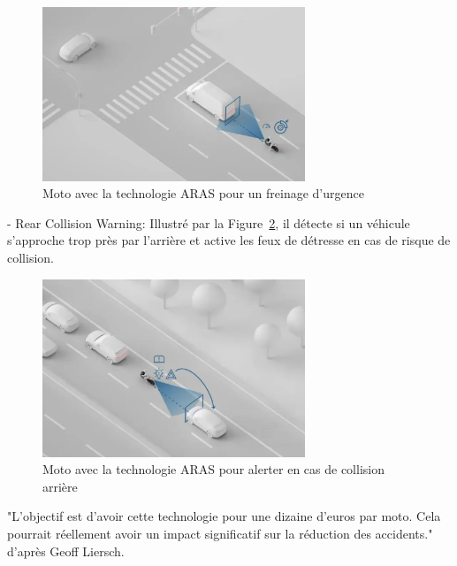 \begin{figure}[H]
    \centering
    \includegraphics[width=0.7\textwidth]{images/ktm_detecteur_dev.png} 
    \caption{Moto avec la technologie ARAS pour un freinage d'urgence}
    \label{detecteuravant}
\end{figure}
- Rear Collision Warning: Illustré par la Figure~\ref{detecteurarriere}, il détecte si un véhicule s'approche trop près par l'arrière et active les feux de détresse en cas de risque de collision. 
\begin{figure}[H]
    \centering
    \includegraphics[width=0.7\textwidth]{images/ktm_detecteur.png} 
    \caption{Moto avec la technologie ARAS pour alerter en cas de collision arrière}
    \label{detecteurarriere}
\end{figure}

"L'objectif est d'avoir cette technologie pour une dizaine d'euros par moto. Cela pourrait réellement avoir un impact significatif sur la réduction des accidents." d'après Geoff Liersch.\\

